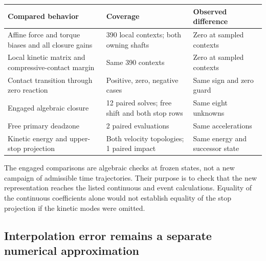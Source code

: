 \documentclass[11pt,letterpaper]{article}
\numberwithin{equation}{section}
\begin{document}
\begin{center}
\begin{tabularx}{\textwidth}{@{}YP{.25\textwidth}P{.23\textwidth}@{}}
\toprule
Compared behavior & Coverage & Observed difference\\
\midrule
Affine force and torque biases and all closure gains & 390 local contexts; both owning shafts & Zero at sampled contexts\\[.4em]
Local kinetic matrix and compressive-contact margin & Same 390 contexts & Zero at sampled contexts\\[.4em]
Contact transition through zero reaction & Positive, zero, negative cases & Same sign and zero guard\\[.4em]
Engaged algebraic closure & 12 paired solves; free shift and both stop rows & Same eight unknowns\\[.4em]
Free primary deadzone & 2 paired evaluations & Same accelerations\\[.4em]
Kinetic energy and upper-stop projection & Both velocity topologies; 1 paired impact & Same energy and successor state\\
\bottomrule
\end{tabularx}
\end{center}

The engaged comparisons are algebraic checks at frozen states, not a new campaign of admissible time trajectories. Their purpose is to check that the new representation reaches the listed continuous and event calculations. Equality of the continuous coefficients alone would not establish equality of the stop projection if the kinetic modes were omitted.

\subsection{Interpolation error remains a separate numerical approximation}
\end{document}
